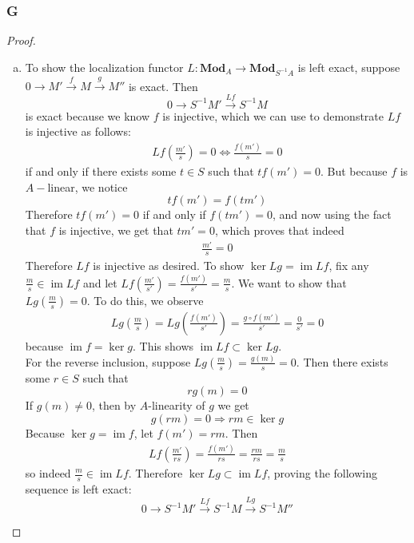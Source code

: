 \documentclass{article}
\DeclareMathOperator{\im}{im}
\newcommand{\Mod}{\mathbf{Mod}} %
\begin{document}
\subsubsection{G}\label{1.6.G}
\begin{proof}
    \begin{enumerate}[(a)]
        \item To show the localization functor $L:\Mod_A\to \Mod_{S^{-1}A}$ is left exact, suppose $0\rightarrow M' \xrightarrow{f}M \xrightarrow{g}M''$ is exact. Then
        \[
        0\rightarrow S^{-1}M'\xrightarrow{Lf} S^{-1}M
        \]
        is exact because we know $f$ is injective, which we can use to demonstrate $Lf$ is injective as follows:
        \begin{align*}
            Lf(\frac{m'}{s})=0\iff \frac{f(m')}{s}=0
        \end{align*}
        if and only if there exists some $t\in S$ such that $tf(m')=0$. But because $f$ is $A-$linear, we notice
        \[
        tf(m')=f(tm')
        \]
        Therefore $tf(m')=0$ if and only if $f(tm')=0$, and now using the fact that $f$ is injective, we get that $tm'=0$, which proves that indeed
        \begin{align*}
            \frac{m'}{s}=0
        \end{align*}
        Therefore $Lf$ is injective as desired. To show $\ker Lg=\im Lf$, fix any $\frac{m}{s}\in \im Lf$ and let $Lf(\frac{m'}{s'})=\frac{f(m')}{s'}=\frac{m}{s}$. We want to show that $Lg(\frac{m}{s})=0$. To do this, we observe
        \begin{align*}
            Lg(\frac{m}{s})=Lg(\frac{f(m')}{s'})=\frac{g\circ f(m')}{s'}=\frac{0}{s'}=0
        \end{align*}
        because $\im f=\ker g$. This shows $\im Lf \subset \ker Lg$.\\
        For the reverse inclusion, suppose $Lg(\frac{m}{s})=\frac{g(m)}{s}=0$. Then there exists some $r\in S$ such that
        \[
        rg(m)=0
        \]
        If $g(m)\ne 0$, then by $A$-linearity of $g$ we get
        \[
        g(rm)=0\Rightarrow rm\in \ker g
        \]
        Because $\ker g=\im f$, let $f(m')=rm$. Then
        \begin{align*}
            Lf(\frac{m'}{rs})=\frac{f(m')}{rs}=\frac{rm}{rs}=\frac{m}{s}
        \end{align*}
        so indeed $\frac{m}{s}\in \im Lf$. Therefore $\ker Lg\subset \im Lf$, proving the following sequence is left exact:
        \[
        0\to S^{-1}M'\xrightarrow{Lf} S^{-1}M\xrightarrow{Lg} S^{-1}M''
\]
\end{enumerate}
\end{proof}
\end{document}
